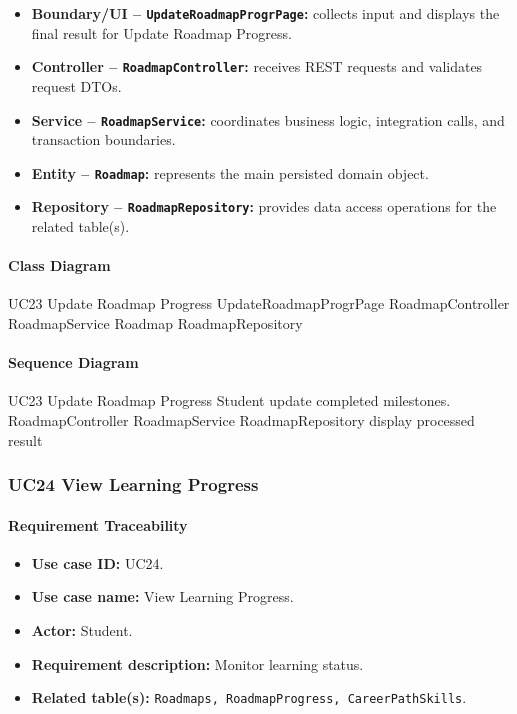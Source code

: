 \begin{itemize}
    \item \textbf{Boundary/UI -- \texttt{UpdateRoadmapProgrPage}:} collects input and displays the final result for Update Roadmap Progress.
    \item \textbf{Controller -- \texttt{RoadmapController}:} receives REST requests and validates request DTOs.
    \item \textbf{Service -- \texttt{RoadmapService}:} coordinates business logic, integration calls, and transaction boundaries.
    \item \textbf{Entity -- \texttt{Roadmap}:} represents the main persisted domain object.
    \item \textbf{Repository -- \texttt{RoadmapRepository}:} provides data access operations for the related table(s).
\end{itemize}

\paragraph{Class Diagram}

\ClassDiagram
{UC23 Update Roadmap Progress}
{UpdateRoadmapProgrPage}
{RoadmapController}
{RoadmapService}
{Roadmap}
{RoadmapRepository}

\paragraph{Sequence Diagram}

\SequenceDiagram
{UC23 Update Roadmap Progress}
{Student}
{update completed milestones.}
{RoadmapController}
{RoadmapService}
{RoadmapRepository}
{display processed result}

\subsubsection{UC24 View Learning Progress}

\paragraph{Requirement Traceability}

\begin{itemize}
    \item \textbf{Use case ID:} UC24.
    \item \textbf{Use case name:} View Learning Progress.
    \item \textbf{Actor:} Student.
    \item \textbf{Requirement description:} Monitor learning status.
    \item \textbf{Related table(s):} \texttt{Roadmaps, RoadmapProgress, CareerPathSkills}.
\end{itemize}

